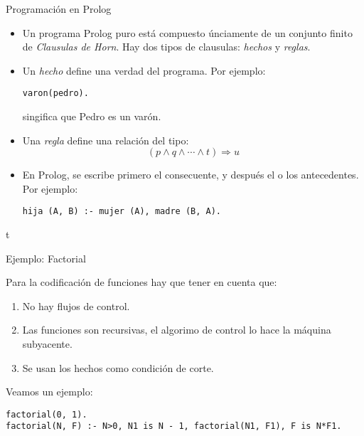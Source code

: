 \documentclass[xcolor=dvipsnames]{beamer}
\begin{document}
\begin{frame}[fragile]{Programación en Prolog}

\begin{itemize}
 \item Un programa Prolog puro está compuesto únciamente de un conjunto finito de \textit{Clausulas de Horn}. Hay dos tipos de clausulas: \textit{hechos} y \textit{reglas}.
 \item Un \textit{hecho} define una verdad del programa. Por ejemplo:
\begin{lstlisting}
varon(pedro).
\end{lstlisting}
singifica que Pedro es un varón.

 \item Una \textit{regla} define una relación del tipo: 
\[
(p \wedge q \wedge \cdots \wedge t) \Rightarrow u
\]
 \item En Prolog, se escribe primero el consecuente, y después el o los antecedentes. Por ejemplo:
\begin{lstlisting}
hija (A, B) :- mujer (A), madre (B, A).
\end{lstlisting}
\end{itemize}

\end{frame}


t\begin{frame}[fragile]{Ejemplo: Factorial}
 
Para la codificación de funciones hay que tener en cuenta que:

\begin{enumerate}
 \item No hay flujos de control.
 \item Las funciones son recursivas, el algorimo de control lo hace la máquina subyacente.
 \item Se usan los hechos como condición de corte. 
\end{enumerate}

Veamos un ejemplo:
\begin{lstlisting}
factorial(0, 1).
factorial(N, F) :- N>0, N1 is N - 1, factorial(N1, F1), F is N*F1.
\end{lstlisting}



\end{frame}
\end{document}
